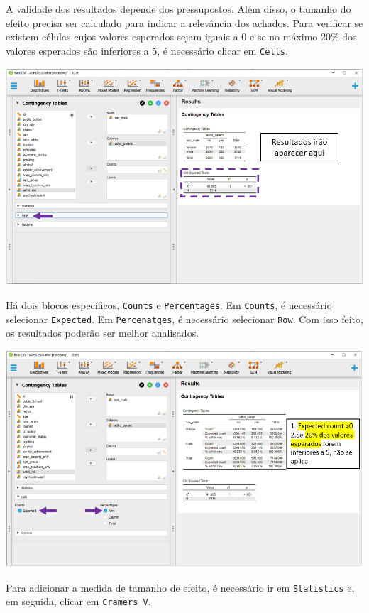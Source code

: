 \documentclass[
]{book}
\begin{document}
A validade dos resultados depende dos pressupostos. Além disso, o
tamanho do efeito precisa ser calculado para indicar a relevância dos
achados. Para verificar se existem células cujos valores esperados sejam
iguais a 0 e se no máximo 20\% dos valores esperados são inferiores a 5,
é necessário clicar em \texttt{Cells}.

\includegraphics{./img/cap_x2_pressupostos.png}

Há dois blocos específicos, \texttt{Counts} e \texttt{Percentages}. Em
\texttt{Counts}, é necessário selecionar \texttt{Expected}. Em
\texttt{Percenatges}, é necessário selecionar \texttt{Row}. Com isso
feito, os resultados poderão ser melhor analisados.

\includegraphics{./img/cap_x2_pressupostos2.png}

Para adicionar a medida de tamanho de efeito, é necessário ir em
\texttt{Statistics} e, em seguida, clicar em
\texttt{Cramer\textquotesingle{}s\ V}.
\end{document}
